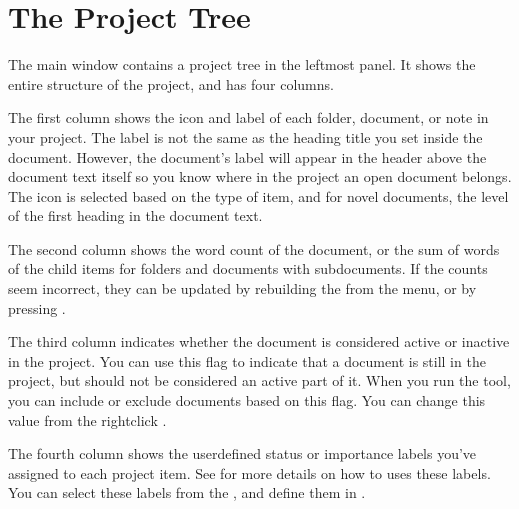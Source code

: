 \documentclass[a4paper,11pt,english]{sphinxmanual}
\begin{document}
\section{The Project Tree}
\label{\detokenize{usage_project:the-project-tree}}\label{\detokenize{usage_project:a-ui-tree}}
\sphinxAtStartPar
The main window contains a project tree in the left\sphinxhyphen{}most panel. It shows the entire structure of
the project, and has four columns.
\begin{description}
\sphinxAtStartPar
The first column shows the icon and label of each folder, document, or note in your project. The
label is not the same as the heading title you set inside the document. However, the document’s
label will appear in the header above the document text itself so you know where in the project
an open document belongs. The icon is selected based on the type of item, and for novel
documents, the level of the first heading in the document text.

\sphinxAtStartPar
The second column shows the word count of the document, or the sum of words of the child items
for folders and documents with sub\sphinxhyphen{}documents. If the counts seem incorrect, they can be updated
by rebuilding the {\hyperref[\detokenize{int_glossary:term-Project-Index}]{}} from the  menu, or by pressing .

\sphinxAtStartPar
The third column indicates whether the document is considered active or inactive in the project.
You can use this flag to indicate that a document is still in the project, but should not be
considered an active part of it. When you run the  tool, you can include or
exclude documents based on this flag. You can change this value from the right\sphinxhyphen{}click
{\hyperref[\detokenize{int_glossary:term-Context-Menu}]{}}.

\sphinxAtStartPar
The fourth column shows the user\sphinxhyphen{}defined status or importance labels you’ve assigned to each
project item. See {\hyperref[\detokenize{usage_project:a-ui-tree-status}]{}} for more details on how to uses these labels. You can
select these labels from the {\hyperref[\detokenize{int_glossary:term-Context-Menu}]{}}, and define them in .

\end{description}
\end{document}
